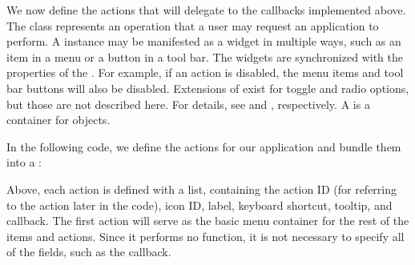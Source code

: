 \documentclass[article,shortnames]{jss}
\begin{document}
We now define the actions that will delegate to the callbacks
implemented above. The  class represents an operation
that a user may request an application to perform. A 
instance may be manifested as a widget in multiple ways, such as an
item in a menu or a button in a tool bar. The widgets are synchronized
with the properties of the . For example, if an action
is disabled, the menu items and tool bar buttons will also be
disabled. Extensions of  exist for toggle and radio
options, but those are not described here. For details, see
 and ,
respectively. A  is a container for
 objects. 

In the following code, we define the actions for our application and
bundle them into a :
Above, each action is defined with a list, containing the action ID
(for referring to the action later in the code),
icon ID, label, keyboard shortcut, tooltip, and callback. The first
action will serve as the basic menu container
for the rest of the items and actions. Since it performs no
function, it is not necessary to specify all of the fields,
such as the callback. 

\end{document}
